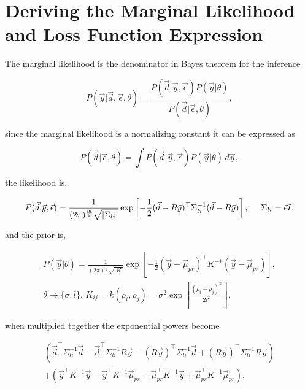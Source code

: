 \chapter{Deriving the Marginal Likelihood and Loss Function Expression}
\label{append:dervml}

The marginal likelihood is the denominator in Bayes theorem for the inference

\begin{equation}
P(\vec{y}|\vec{d}, \vec\epsilon, \theta) = \frac{P(\vec{d}|\vec{y},\vec\epsilon)P(\vec{y}|\theta)}{P(\vec d|\vec\epsilon,\theta)},
\end{equation}

\noindent since the marginal likelihood is a normalizing constant it can be expressed as

\begin{equation}
P(\vec d|\vec\epsilon,\theta) = \int P(\vec{d}|\vec{y},\vec\epsilon)P(\vec{y}|\theta)  \, d\vec y,
\end{equation}

\noindent the likelihood is,

\begin{equation}
P(\vec{d}|\vec{y},\vec\epsilon) = \frac{1}{(2\pi)^{\frac{m}{2}} \sqrt{|\Sigma_{li}|}} \exp \left[ -\frac{1}{2} (\vec d - R\vec y)^{\top} \Sigma^{-1}_{li} (\vec d - R\vec y) \right], \hspace{0.5cm} \Sigma_{li} = \vec \epsilon I,
\end{equation}

\noindent and the prior is,

\begin{equation}
\begin{split}
P(\vec y|\theta) = \frac{1}{(2\pi)^{\frac{n}{2}} \sqrt{|K|}} \exp \left[ -\frac{1}{2} (\vec y - \vec \mu_{pr})^{\top} K^{-1} (\vec y - \vec \mu_{pr}) \right],\\
\theta \rightarrow \{\sigma, l\}, \, K_{ij} = k(\rho_i, \rho_j) = \sigma^2 \exp \left[\frac{(\rho_i - \rho_j)^2}{2l^2}\right],
\end{split}
\end{equation}

\noindent when multiplied together the exponential powers become 

\begin{multline*}
\left(\vec d ^\top \Sigma_{li}^{-1} \vec d - \vec d^\top \Sigma_{li}^{-1} R\vec y - (R\vec y)^\top \Sigma_{li}^{-1} \vec d + (R\vec y)^\top \Sigma_{li}^{-1} R\vec y \right)\\ 
+ \left( \vec y^\top K^{-1} \vec y - \vec y^\top K^{-1} \vec \mu_{pr} - \vec \mu_{pr}^\top K^{-1} \vec y + \vec \mu_{pr}^\top K^{-1} \vec \mu_{pr} \right),
\end{multline*}


